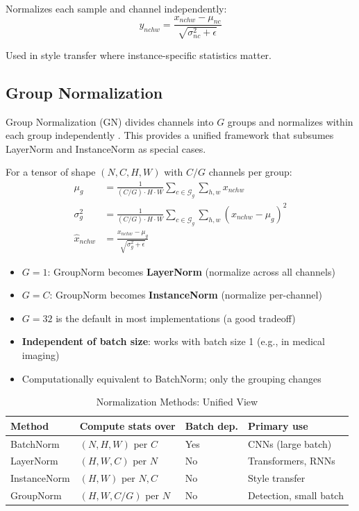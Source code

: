 Normalizes each sample and channel independently:
\begin{equation}
y_{nchw} = \frac{x_{nchw} - \mu_{nc}}{\sqrt{\sigma_{nc}^2 + \epsilon}}
\end{equation}

Used in style transfer where instance-specific statistics matter.

\subsection{Group Normalization}

Group Normalization (GN) divides channels into $G$ groups and normalizes within each group independently \cite{wu2018group}. This provides a unified framework that subsumes LayerNorm and InstanceNorm as special cases.

For a tensor of shape $(N, C, H, W)$ with $C/G$ channels per group:
\begin{align}
\mu_g &= \frac{1}{(C/G) \cdot H \cdot W} \sum_{c \in \mathcal{G}_g} \sum_{h,w} x_{nchw} \\
\sigma_g^2 &= \frac{1}{(C/G) \cdot H \cdot W} \sum_{c \in \mathcal{G}_g} \sum_{h,w} (x_{nchw} - \mu_g)^2 \\
\hat{x}_{nchw} &= \frac{x_{nchw} - \mu_g}{\sqrt{\sigma_g^2 + \epsilon}}
\end{align}

\begin{properties}
\begin{itemize}
    \item $G = 1$: GroupNorm becomes \textbf{LayerNorm} (normalize across all channels)
    \item $G = C$: GroupNorm becomes \textbf{InstanceNorm} (normalize per-channel)
    \item $G = 32$ is the default in most implementations (a good tradeoff)
    \item \textbf{Independent of batch size}: works with batch size 1 (e.g., in medical imaging)
    \item Computationally equivalent to BatchNorm; only the grouping changes
\end{itemize}
\end{properties}

\begin{table}[ht]
    \centering
    \caption{Normalization Methods: Unified View}
    \begin{tabular}{L{2cm} L{3cm} L{2cm} L{3.5cm}}
        \toprule
        \textbf{Method} & \textbf{Compute stats over} & \textbf{Batch dep.} & \textbf{Primary use} \\
        \midrule
        BatchNorm & $(N, H, W)$ per $C$ & Yes & CNNs (large batch) \\
        LayerNorm & $(H, W, C)$ per $N$ & No & Transformers, RNNs \\
        InstanceNorm & $(H, W)$ per $N,C$ & No & Style transfer \\
        GroupNorm & $(H, W, C/G)$ per $N$ & No & Detection, small batch \\
        \bottomrule
    \end{tabular}
\end{table}

